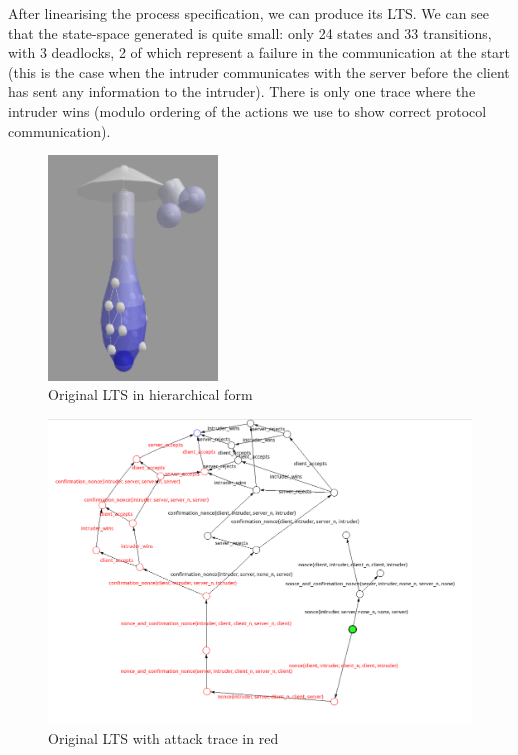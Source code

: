 \documentclass[11pt]{article}
\theoremstyle{definition}
\theoremstyle{plain}
\theoremstyle{definition}
\begin{document}
\begin{appendices}
After linearising the process specification, we can produce its LTS. We can see that the state-space generated is quite small: only 24 states and 33 transitions, with 3 deadlocks, 2 of which represent a failure in the communication at the start (this is the case when the intruder communicates with the server before the client has sent any information to the intruder). There is only one trace where the intruder wins (modulo ordering of the actions we use to show correct protocol communication).

\begin{figure}
\centering
\includegraphics[width=0.4\textwidth, keepaspectratio]{img/Needham-Schroeder/state-LTSview.png}
\caption{Original LTS in hierarchical form}\label{ltsNSView}
\end{figure}
\begin{figure}
\includegraphics[width=\textwidth,keepaspectratio]{img/Needham-Schroeder/state-LTSgraph.png}
\caption{Original LTS with attack trace in red}\label{ltsNSGraph}
\end{figure}


\end{appendices}
\end{document}
